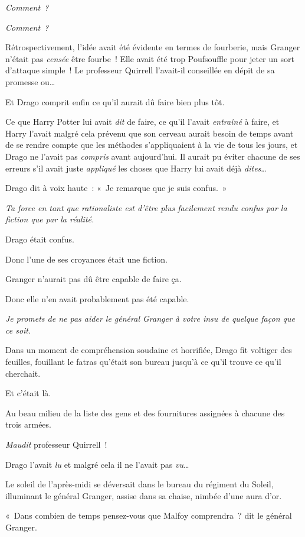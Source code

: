 \emph{Comment~?}

\emph{Comment~?}

Rétrospectivement, l'idée avait été évidente en termes de fourberie, mais Granger n'était pas \emph{censée} être fourbe~! Elle avait été trop Poufsouffle pour jeter un sort d'attaque simple~! Le professeur Quirrell l'avait-il conseillée en dépit de sa promesse ou…

Et Drago comprit enfin ce qu'il aurait dû faire bien plus tôt.

Ce que Harry Potter lui avait \emph{dit} de faire, ce qu'il l'avait \emph{entraîné} à faire, et Harry l'avait malgré cela prévenu que son cerveau aurait besoin de temps avant de se rendre compte que les méthodes s'appliquaient à la vie de tous les jours, et Drago ne l'avait pas \emph{compris} avant aujourd'hui. Il aurait pu éviter chacune de ses erreurs s'il avait juste \emph{appliqué} les choses que Harry lui avait déjà \emph{dites}…

Drago dit à voix haute~: «~Je remarque que je suis confus.~»

\emph{Ta force en tant que rationaliste est d'être plus facilement rendu confus par la fiction que par la réalité.}

Drago était confus.

Donc l'une de ses croyances était une fiction.

Granger n'aurait pas dû être capable de faire ça.

Donc elle n'en avait probablement pas été capable.

\emph{Je promets de ne pas aider le général Granger à votre insu de quelque façon que ce soit.}

Dans un moment de compréhension soudaine et horrifiée, Drago fit voltiger des feuilles, fouillant le fatras qu'était son bureau jusqu'à ce qu'il trouve ce qu'il cherchait.

Et c'était là.

Au beau milieu de la liste des gens et des fournitures assignées à chacune des trois armées.

\emph{Maudit} professeur Quirrell~!

Drago l'avait \emph{lu} et malgré cela il ne l'avait pas \emph{vu}…

\later

Le soleil de l'après-midi se déversait dans le bureau du régiment du Soleil, illuminant le général Granger, assise dans sa chaise, nimbée d'une aura d'or.

«~Dans combien de temps pensez-vous que Malfoy comprendra~? dit le général Granger.

